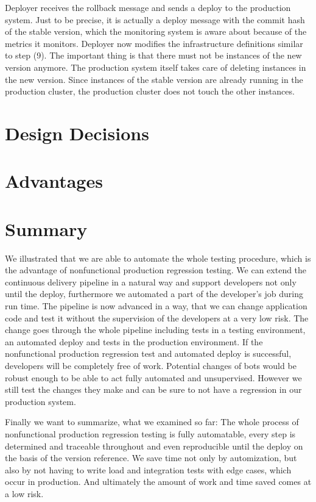 Deployer receives the rollback message and sends a deploy to the production system. Just
to be precise, it is actually a deploy message with the commit hash of the stable version,
which the monitoring system is aware about because of the metrics it monitors. Deployer
now modifies the infrastructure definitions similar to step (9). The important thing is
that there must not be instances of the new version anymore. The production system itself
takes care of deleting instances in the new version. Since instances of the stable version
are already running in the production cluster, the production cluster does not touch the
other instances.

\section{Design Decisions}

\section{Advantages}

\section{Summary}

We illustrated that we are able to automate the whole testing procedure, which is the
advantage of nonfunctional production regression testing. We can extend the continuous
delivery pipeline in a natural way and support developers not only until the deploy,
furthermore we automated a part of the developer's job during run time. The pipeline is
now advanced in a way, that we can change application code and test it without the
supervision of the developers at a very low risk. The change goes through the whole
pipeline including tests in a testing environment, an automated deploy and tests in the
production environment. If the nonfunctional production regression test and automated
deploy is successful, developers will be completely free of work. Potential changes of
bots would be robust enough to be able to act fully automated and unsupervised. However we
still test the changes they make and can be sure to not have a regression in our
production system.

Finally we want to summarize, what we examined so far: The whole process of nonfunctional
production regression testing is fully automatable, every step is determined and traceable
throughout and even reproducible until the deploy on the basis of the version
reference. We save time not only by automization, but also by not having to write load and
integration tests with edge cases, which occur in production. And ultimately the amount of
work and time saved comes at a low risk.

